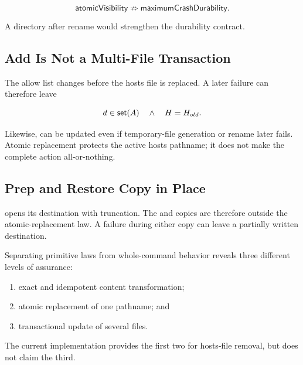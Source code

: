 \[
  \mathsf{atomicVisibility}\not\Longrightarrow
  \mathsf{maximumCrashDurability}.
\]

A directory  after rename would strengthen the durability
contract.

\subsection{Add Is Not a Multi-File Transaction}

The allow list changes before the hosts file is replaced.  A later failure can
therefore leave

\[
  d\in\mathsf{set}(A)\quad\land\quad H=H_{old}.
\]

Likewise,  can be updated even if temporary-file generation or
rename later fails.  Atomic replacement protects the active hosts pathname; it
does not make the complete  action all-or-nothing.

\subsection{Prep and Restore Copy in Place}

 opens its destination with truncation.  The  and
 copies are therefore outside the atomic-replacement law.  A
failure during either copy can leave a partially written destination.

\begin{observation}
Separating primitive laws from whole-command behavior reveals three different
levels of assurance:
\begin{enumerate}
  \item exact and idempotent content transformation;
  \item atomic replacement of one pathname; and
  \item transactional update of several files.
\end{enumerate}
The current implementation provides the first two for hosts-file removal, but
does not claim the third.
\end{observation}
